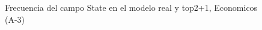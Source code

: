 \begin{figure}[H]
    \centering
    
    \caption{Frecuencia del campo State en el modelo real y top2+1, Economicos (A-3)}
    \label{frecuency-State-top2+1}
\end{figure}
